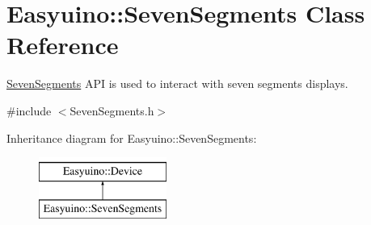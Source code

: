 \hypertarget{class_easyuino_1_1_seven_segments}{}\section{Easyuino\+:\+:Seven\+Segments Class Reference}
\label{class_easyuino_1_1_seven_segments}


\hyperlink{class_easyuino_1_1_seven_segments}{Seven\+Segments} A\+PI is used to interact with seven segments displays.  




{\ttfamily \#include $<$Seven\+Segments.\+h$>$}

Inheritance diagram for Easyuino\+:\+:Seven\+Segments\+:\begin{figure}[H]
\begin{center}
\leavevmode
\includegraphics[height=2.000000cm]{class_easyuino_1_1_seven_segments}
\end{center}
\end{figure}
